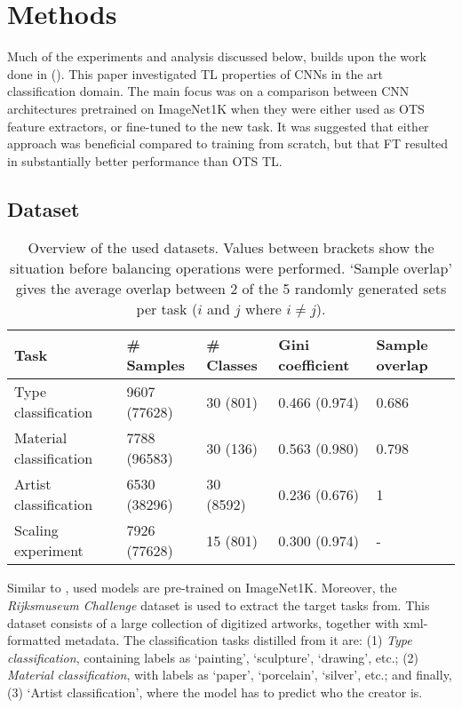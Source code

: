 \section{Methods}

Much of the experiments and analysis discussed below, builds upon the work done in \citeauthor{sabatelli2018deep} (\citeyear{sabatelli2018deep}). This paper investigated TL properties of CNNs in the art classification domain. The main focus was on a comparison between CNN architectures pretrained on ImageNet1K when they were either used as OTS feature extractors, or fine-tuned to the new task. It was suggested that either approach was beneficial compared to training from scratch, but that FT resulted in substantially better performance than OTS TL.

\subsection{Dataset}

\begin{table*}[tb]
\centering
\small
\begin{tabular}{lllll}
\hline
\textbf{Task} & \textbf{\# Samples} & \textbf{\# Classes} & \textbf{Gini coefficient} & \textbf{Sample overlap} \\ \hline
Type classification & 9607 (77628) & 30 (801) & 0.466 (0.974) & 0.686 \\
Material classification & 7788 (96583) & 30 (136) & 0.563 (0.980) & 0.798 \\
Artist classification & 6530 (38296) & 30 (8592) & 0.236 (0.676) & 1 \\
Scaling experiment & 7926 (77628) & 15 (801) & 0.300 (0.974) & - \\ \hline
\end{tabular}
\caption{Overview of the used datasets. Values between brackets show the situation before balancing operations were performed. `Sample overlap' gives the average overlap between 2 of the 5 randomly generated sets per task ($i$ and $j$ where $i \neq j$).}
\label{methods:datasets}
\end{table*}

Similar to \citeauthor{sabatelli2018deep}, used models are pre-trained on ImageNet1K. Moreover, the \textit{Rijksmuseum Challenge} dataset \citep{mensink14icmr} is used to extract the target tasks from. This dataset consists of a large collection of digitized artworks, together with xml-formatted metadata. The classification tasks distilled from it are: (1) \textit{Type classification}, containing labels as `painting', `sculpture', `drawing', etc.; (2) \textit{Material classification}, with labels as `paper', `porcelain', `silver', etc.; and finally, (3) `Artist classification', where the model has to predict who the creator is.

